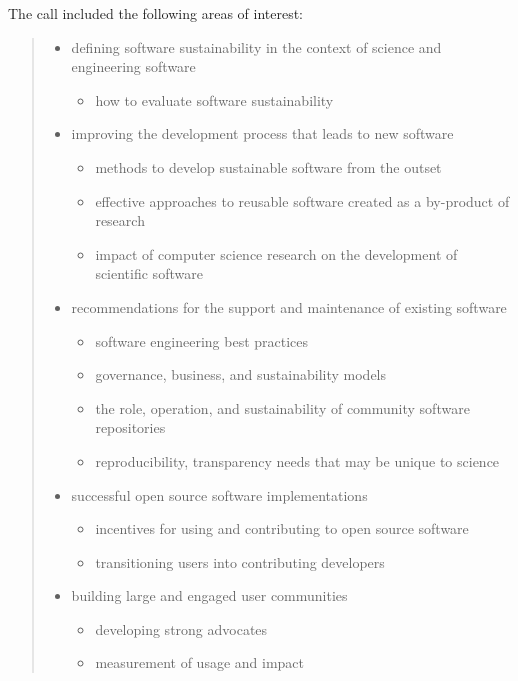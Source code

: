 \documentclass[11pt, oneside]{amsart}
\begin{document}
The call included the following areas of interest:
\begin{quote}
\begin{itemize} 
\renewcommand{\labelenumi}{\textbf{\theenumi}.}
\setlength{\rightmargin}{1em}
\item defining software sustainability in the context of science and engineering
software
\begin{itemize}
\item how to evaluate software sustainability
\end{itemize}

\item improving the development process that leads to new software
\begin{itemize}
\item methods to develop sustainable software from the outset
\item effective approaches to reusable software created as a by-product of
research
\item impact of computer science research on the development of scientific
software
\end{itemize}

\item recommendations for the support and maintenance of existing software
\begin{itemize}
\item software engineering best practices
\item governance, business, and sustainability models
\item the role, operation, and
sustainability of community software repositories 
\item reproducibility, transparency needs that may be unique to science
\end{itemize}

\item successful open source software implementations
\begin{itemize}
\item incentives for using and contributing to open source software
\item transitioning users into contributing developers
\end{itemize}

\item building large and engaged user communities
\begin{itemize}
\item developing strong advocates
\item measurement of usage and impact
\end{itemize}


\end{itemize}
\end{quote}
\end{document}
